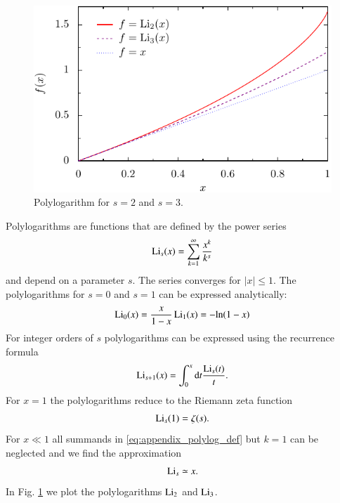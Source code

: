 \begin{figure}
  \begin{center}
      \includegraphics[scale=0.8]{plots/polylog.pdf}
  \end{center}
  \caption{Polylogarithm for $s=2$ and $s=3$.}
  \label{fig:appendix_polylog}
\end{figure}

Polylogarithms are functions that are defined by the power series
\begin{equation}
\label{eq:appendix_polylog_def}
\operatorname{Li}_s(x) = \sum_{k=1}^\infty \frac{x^k}{k^s}
\end{equation}
and depend on a parameter $s$. The series converges for $|x|\le1$.
The polylogarithms for $s=0$ and $s=1$ can be expressed analytically:
\begin{equation}
\operatorname{Li}_0(x) = \frac{x}{1-x} \\
\operatorname{Li}_1(x) = -\text{ln}{\left(1-x\right)}
\end{equation}
For integer orders of $s$ polylogarithms can be expressed using the recurrence
formula
\begin{equation}
\operatorname{Li}_{s+1}(x) = \int_0^x \mathrm{d}t \frac{\text{Li}_s(t)}{t}.
\end{equation}
For $x=1$ the polylogarithms reduce to the Riemann zeta function
\begin{equation}
\operatorname{Li}_s(1) = \zeta(s).
\end{equation}
For $x\ll1$ all summands in \eqref{eq:appendix_polylog_def} but $k=1$ can
be neglected and we find the approximation
\begin{equation}
\operatorname{Li}_s \simeq x.
\end{equation}
In Fig. \ref{fig:appendix_polylog} we plot the polylogarithms $\operatorname{Li}_2$ and $\operatorname{Li}_3$.


